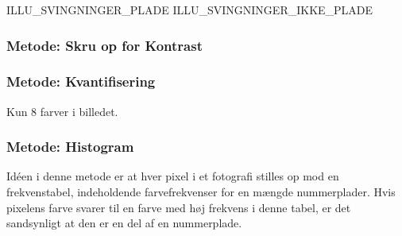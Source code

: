 ILLU\_SVINGNINGER\_PLADE ILLU\_SVINGNINGER\_IKKE\_PLADE



\subsubsection{Metode: Skru op for Kontrast}



\subsubsection{Metode: Kvantifisering}
Kun 8 farver i billedet.

\subsubsection{Metode: Histogram}
\label{sec_histo}

Idéen i denne metode er at hver pixel i et fotografi stilles op mod en frekvenstabel, indeholdende farvefrekvenser for en mængde nummerplader. Hvis pixelens farve svarer til en farve med høj frekvens i denne tabel, er det sandsynligt at den er en del af en nummerplade.



